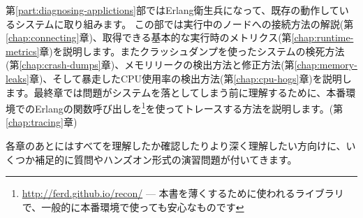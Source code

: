 第\ref{part:diagnosing-applictions}部ではErlang衛生兵になって、既存の動作しているシステムに取り組みます。
この部では実行中のノードへの接続方法の解説(第\ref{chap:connecting}章)、取得できる基本的な実行時のメトリクス(第\ref{chap:runtime-metrics}章)を説明します。またクラッシュダンプを使ったシステムの検死方法(第\ref{chap:crash-dumps}章)、メモリリークの検出方法と修正方法(第\ref{chap:memory-leaks}章)、そして暴走したCPU使用率の検出方法(第\ref{chap:cpu-hogs}章)を説明します。最終章では問題がシステムを落としてしまう前に理解するために、本番環境でのErlangの関数呼び出しを\footnote{\href{http://ferd.github.io/recon/}{http://ferd.github.io/recon/} --- 本書を薄くするために使われるライブラリで、一般的に本番環境で使っても安心なものです}を使ってトレースする方法を説明します。(第\ref{chap:tracing}章)

各章のあとにはすべてを理解したか確認したりより深く理解したい方向けに、いくつか補足的に質問やハンズオン形式の演習問題が付いてきます。

